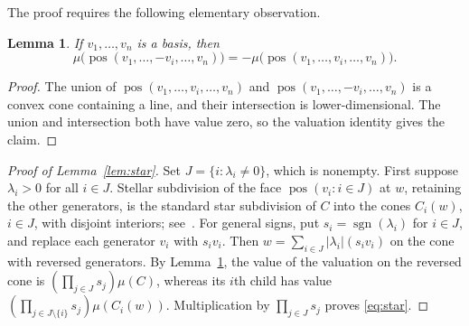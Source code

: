 \documentclass[11pt]{article}
\DeclareMathOperator{\pos}{pos}
\DeclareMathOperator{\sgn}{sgn}
\newtheorem{lemma}[theorem]{Lemma}
\begin{document}
The proof requires the following elementary observation.

\begin{lemma}\label{lem:flip}
If $v_1,\ldots,v_n$ is a basis, then
\begin{equation}\label{eq:flip}
 \mu\bigl(\pos(v_1,\ldots,-v_i,\ldots,v_n)\bigr)
 =-\mu\bigl(\pos(v_1,\ldots,v_i,\ldots,v_n)\bigr).
\end{equation}
\end{lemma}

\begin{proof}
The union of $\pos(v_1,\ldots,v_i,\ldots,v_n)$ and $\pos(v_1,\ldots,-v_i,\ldots,v_n)$
is a convex cone containing a line, and their intersection is lower-dimensional.
The union and intersection both have value zero, so the valuation identity gives the claim.
\end{proof}

\begin{proof}[Proof of Lemma~\ref{lem:star}]
Set $J=\{i:\lambda_i\ne0\}$, which is nonempty. First suppose
$\lambda_i>0$ for all $i\in J$.
Stellar subdivision of the face
$\pos(v_i\colon i\in J)$ at $w$, retaining the other generators, is the standard star subdivision
of $C$ into the cones $C_i(w)$, $i\in J$, with disjoint interiors; see~\cite[Lemma~11.1.3]{CLS11:Toric-Varieties}.
For general signs, put $s_i=\sgn(\lambda_i)$ for $i\in J$, 
and replace each generator $v_i$ with $s_i v_i$. 
Then $w=\sum_{i\in J}|\lambda_i|(s_i v_i)$
on the cone with reversed generators. By Lemma~\ref{lem:flip}, 
the value of the valuation on the reversed cone is
$(\prod_{j\in J}s_j)\mu(C)$, whereas its $i$th
child has value $(\prod_{j\in J\setminus\{i\}}s_j)\mu(C_i(w))$.
Multiplication by $\prod_{j\in J}s_j$ proves \eqref{eq:star}.
\end{proof}

\end{document}
